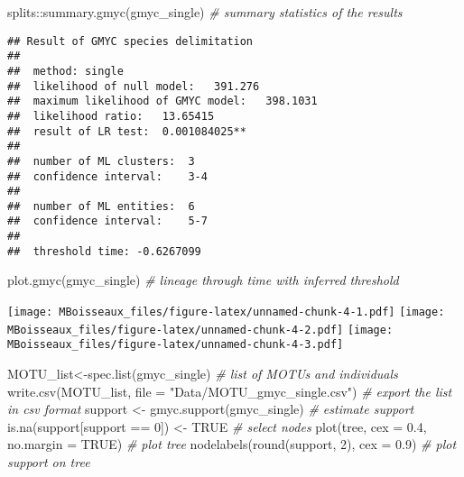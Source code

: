 \documentclass[
]{book}
\newenvironment{Shaded}{\begin{snugshade}}{\end{snugshade}}
\newcommand{\AttributeTok}[1]{\textcolor[rgb]{0.77,0.63,0.00}{#1}}
\newcommand{\CommentTok}[1]{\textcolor[rgb]{0.56,0.35,0.01}{\textit{#1}}}
\newcommand{\ConstantTok}[1]{\textcolor[rgb]{0.00,0.00,0.00}{#1}}
\newcommand{\DecValTok}[1]{\textcolor[rgb]{0.00,0.00,0.81}{#1}}
\newcommand{\FloatTok}[1]{\textcolor[rgb]{0.00,0.00,0.81}{#1}}
\newcommand{\FunctionTok}[1]{\textcolor[rgb]{0.00,0.00,0.00}{#1}}
\newcommand{\NormalTok}[1]{#1}
\newcommand{\OtherTok}[1]{\textcolor[rgb]{0.56,0.35,0.01}{#1}}
\newcommand{\SpecialCharTok}[1]{\textcolor[rgb]{0.00,0.00,0.00}{#1}}
\newcommand{\StringTok}[1]{\textcolor[rgb]{0.31,0.60,0.02}{#1}}
\begin{document}
\begin{Shaded}
\begin{Highlighting}[]
\NormalTok{splits}\SpecialCharTok{::}\FunctionTok{summary.gmyc}\NormalTok{(gmyc\_single) }\CommentTok{\# summary statistics of the results}
\end{Highlighting}
\end{Shaded}

\begin{verbatim}
## Result of GMYC species delimitation
## 
##  method: single
##  likelihood of null model:   391.276
##  maximum likelihood of GMYC model:   398.1031
##  likelihood ratio:   13.65415
##  result of LR test:  0.001084025**
## 
##  number of ML clusters:  3
##  confidence interval:    3-4
## 
##  number of ML entities:  6
##  confidence interval:    5-7
## 
##  threshold time: -0.6267099
\end{verbatim}

\begin{Shaded}
\begin{Highlighting}[]
\FunctionTok{plot.gmyc}\NormalTok{(gmyc\_single) }\CommentTok{\# lineage through time with inferred threshold}
\end{Highlighting}
\end{Shaded}

\texttt{[image: MBoisseaux\_files/figure-latex/unnamed-chunk-4-1.pdf]} \texttt{[image: MBoisseaux\_files/figure-latex/unnamed-chunk-4-2.pdf]} \texttt{[image: MBoisseaux\_files/figure-latex/unnamed-chunk-4-3.pdf]}

\begin{Shaded}
\begin{Highlighting}[]
\NormalTok{MOTU\_list}\OtherTok{\textless{}{-}}\FunctionTok{spec.list}\NormalTok{(gmyc\_single) }\CommentTok{\# list of MOTUs and individuals}
\FunctionTok{write.csv}\NormalTok{(MOTU\_list, }\AttributeTok{file =} \StringTok{"Data/MOTU\_gmyc\_single.csv"}\NormalTok{) }\CommentTok{\# export the list in csv format}
\NormalTok{support }\OtherTok{\textless{}{-}} \FunctionTok{gmyc.support}\NormalTok{(gmyc\_single) }\CommentTok{\# estimate support}
\FunctionTok{is.na}\NormalTok{(support[support }\SpecialCharTok{==} \DecValTok{0}\NormalTok{]) }\OtherTok{\textless{}{-}} \ConstantTok{TRUE} \CommentTok{\# select nodes}
\FunctionTok{plot}\NormalTok{(tree, }\AttributeTok{cex =} \FloatTok{0.4}\NormalTok{, }\AttributeTok{no.margin =} \ConstantTok{TRUE}\NormalTok{) }\CommentTok{\# plot tree}
\FunctionTok{nodelabels}\NormalTok{(}\FunctionTok{round}\NormalTok{(support, }\DecValTok{2}\NormalTok{), }\AttributeTok{cex =} \FloatTok{0.9}\NormalTok{) }\CommentTok{\# plot support on tree}
\end{Highlighting}
\end{Shaded}
\end{document}
